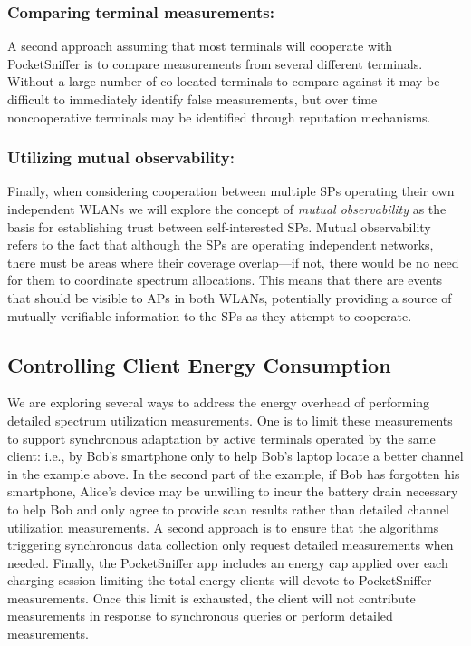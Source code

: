 \subsubsection{Comparing terminal measurements:\space} A second approach
assuming that most terminals will cooperate with PocketSniffer is to compare
measurements from several different terminals. Without a large number of
co-located terminals to compare against it may be difficult to immediately
identify false measurements, but over time noncooperative terminals may be
identified through reputation mechanisms.

\subsubsection{Utilizing mutual observability:\space} Finally, when
considering cooperation between multiple SPs operating their own independent
WLANs we will explore the concept of \textit{mutual observability} as the
basis for establishing trust between self-interested SPs. Mutual
observability refers to the fact that although the SPs are operating
independent networks, there must be areas where their coverage overlap---if
not, there would be no need for them to coordinate spectrum allocations. This
means that there are events that should be visible to APs in both WLANs,
potentially providing a source of mutually-verifiable information to the SPs
as they attempt to cooperate.

\subsection{Controlling Client Energy Consumption}
\label{subsec-energy}

We are exploring several ways to address the energy overhead of performing
detailed spectrum utilization measurements. One is to limit these
measurements to support synchronous adaptation by active terminals operated
by the same client: i.e., by Bob's smartphone only to help Bob's laptop
locate a better channel in the example above. In the second part of the
example, if Bob has forgotten his smartphone, Alice's device may be unwilling
to incur the battery drain necessary to help Bob and only agree to provide
scan results rather than detailed channel utilization measurements. A second
approach is to ensure that the algorithms triggering synchronous data
collection only request detailed measurements when needed. Finally, the
PocketSniffer app includes an energy cap applied over each charging session
limiting the total energy clients will devote to PocketSniffer measurements.
Once this limit is exhausted, the client will not contribute measurements in
response to synchronous queries or perform detailed measurements.

